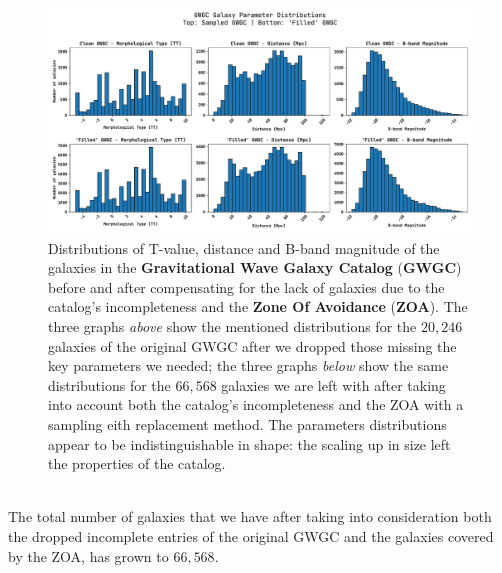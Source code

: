 \begin{figure}[h!]
    \begin{center}
        \includegraphics[width=\textwidth]{images/distro_comparison.pdf}
    \end{center}
    \caption{Distributions of T-value, distance and B-band magnitude of the galaxies in the \textbf{Gravitational Wave Galaxy Catalog} (\textbf{GWGC}) before and after compensating for the lack of galaxies due to the catalog's incompleteness and the \textbf{Zone Of Avoidance} (\textbf{ZOA}). 
    The three graphs \textit{above} show the mentioned distributions for the $20,246$ galaxies of the original GWGC after we dropped those missing the key parameters we needed; the three graphs \textit{below} show the same distributions for the $66,568$ galaxies we are left with after taking into account both the catalog's incompleteness and the ZOA with a sampling eith replacement method.
    The parameters distributions appear to be indistinguishable in shape: the scaling up in size left the properties of the catalog.
    }\label{fig: distro comparison}
\end{figure}
\\
The total number of galaxies that we have after taking into consideration both the dropped incomplete entries of the original GWGC and the galaxies covered by the ZOA, has grown to $66,568$.


